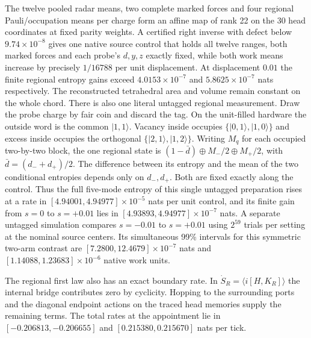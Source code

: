 The twelve pooled radar means, two complete marked forces and four
regional Pauli/occupation means per charge form an affine map of rank
22 on the 30 head coordinates at fixed parity weights. A certified
right inverse with defect below $9.74\times10^{-8}$ gives one
native source control that holds all twelve ranges, both marked
forces and each probe's $d,y,z$ exactly fixed, while both work means
increase by precisely $1/16788$ per unit displacement. At displacement
$0.01$ the finite regional entropy gains exceed
$4.0153\times10^{-7}$ and $5.8625\times10^{-7}$ nats respectively.
The reconstructed tetrahedral area and volume remain constant on the
whole chord. There is also one literal untagged regional measurement.
Draw the probe charge by fair coin and discard the tag. On the
unit-filled hardware the outside word is the common $|1,1\rangle$.
Vacancy inside occupies $\{|0,1\rangle,|1,0\rangle\}$ and excess
inside occupies the orthogonal $\{|2,1\rangle,|1,2\rangle\}$.
Writing $M_q$ for each occupied two-by-two block, the one regional
state is $(1-\bar d)\oplus M_-/2\oplus M_+/2$, with
$\bar d=(d_-+d_+)/2$. The difference between its entropy and the mean
of the two conditional entropies depends only on $d_-,d_+$. Both are
fixed exactly along the control. Thus the full five-mode entropy of
this single untagged preparation rises at a rate in
$[4.94001,4.94977]\times10^{-5}$ nats per unit control, and its finite
gain from $s=0$ to $s=+0.01$ lies in
$[4.93893,4.94977]\times10^{-7}$ nats. A separate untagged simulation
compares $s=-0.01$ to $s=+0.01$ using $2^{59}$ trials per setting
at the nominal source centers. Its simultaneous 99\% intervals
for this symmetric two-arm contrast are $[7.2800,12.4679]\times10^{-7}$
nats and $[1.14088,1.23683]\times10^{-6}$ native work units.

The regional first law also has an exact boundary rate.
In $\dot S_R=\langle i[H,K_R]\rangle$ the internal bridge contributes
zero by cyclicity. Hopping to the surrounding ports and the diagonal
endpoint actions on the traced head memories supply the remaining
terms. The total rates at the appointment lie in
$[-0.206813,-0.206655]$ and $[0.215380,0.215670]$ nats per tick.

